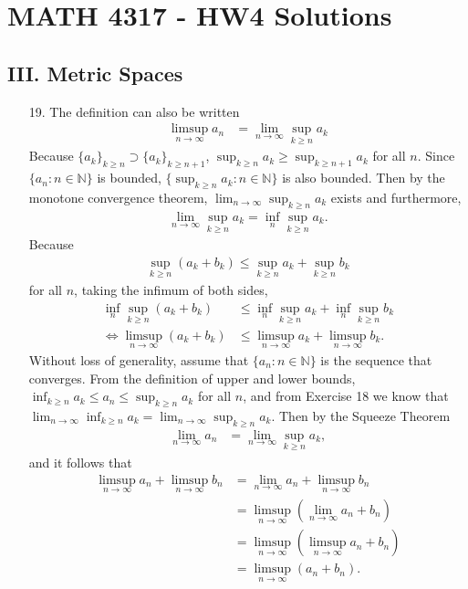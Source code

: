 \documentclass[a4paper,12pt]{article}
\begin{document}
    \section*{MATH 4317 - HW4 Solutions}
    \subsection*{III. Metric Spaces}
    \begin{enumerate}
        \item[19.]
            The definition can also be written
            \begin{align*}
                \limsup_{n \to \infty} a_n &= \lim_{n \to \infty} \sup_{k \geq n} a_k
            \end{align*}
            Because $\{a_k\}_{k \geq n} \supset \{a_{k}\}_{k \geq n + 1}$, $\sup_{k \geq n} a_k \geq \sup_{k \geq n + 1} a_k$ for all $n$. Since $\{a_n : n \in \mathbb{N}\}$ is bounded, $\{\sup_{k \geq n} a_k : n \in \mathbb{N} \}$ is also bounded. Then by the monotone convergence theorem, $\lim_{n \to \infty} \sup_{k \geq n} a_k$ exists and furthermore,
            \begin{align*}
                \lim_{n \to \infty} \sup_{k \geq n} a_k = \inf_{n} \sup_{k \geq n} a_k.
            \end{align*}
            Because
            \begin{align*}
                \sup_{k \geq n}(a_k + b_k) \leq \sup_{k \geq n} a_k + \sup_{k \geq n} b_k
            \end{align*}
            for all $n$, taking the infimum of both sides,
            \begin{align*}
                \inf_n \sup_{k \geq n}(a_k + b_k) &\leq \inf_n \sup_{k \geq n} a_k + \inf_n \sup_{k \geq n} b_k \\
                \Leftrightarrow \limsup_{n \to \infty}(a_k + b_k) &\leq \limsup_{n \to \infty} a_k + \limsup_{n \to \infty} b_k.
            \end{align*}
            Without loss of generality, assume that $\{a_n : n \in \mathbb{N}\}$ is the sequence that converges. From the definition of upper and lower bounds, $\inf_{k \geq n} a_k \leq a_n \leq \sup_{k \geq n} a_k$ for all $n$, and from Exercise 18 we know that $\lim_{n \to \infty} \inf_{k \geq n} a_k = \lim_{n \to \infty} \sup_{k \geq n} a_k$. Then by the Squeeze Theorem
            \begin{align*}
                \lim_{n \to \infty} a_n &= \lim_{n \to \infty} \sup_{k \geq n} a_k,
            \end{align*}
            and it follows that
            \begin{align*}
                \limsup_{n \to \infty} a_n + \limsup_{n \to \infty} b_n &= \lim_{n \to \infty} a_n + \limsup_{n \to \infty} b_n \\
                &= \limsup_{n \to \infty} (\lim_{n \to \infty} a_n + b_n) \\
                &= \limsup_{n \to \infty} (\limsup_{n \to \infty} a_n + b_n) \\
                &= \limsup_{n \to \infty} (a_n + b_n).
            \end{align*}


\end{enumerate}
\end{document}
